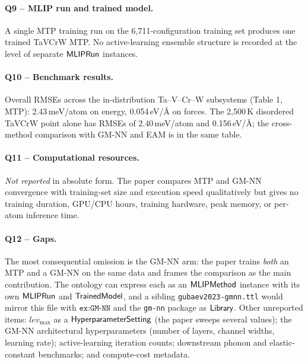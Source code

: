 \paragraph{Q9 -- MLIP run and trained model.}
A single MTP training run on the 6{,}711-configuration training set
produces one trained TaVCrW MTP. No active-learning ensemble
structure is recorded at the level of separate
$\mathsf{MLIPRun}$ instances.


\paragraph{Q10 -- Benchmark results.}
Overall RMSEs across the in-distribution Ta--V--Cr--W subsystems
(Table 1, MTP): 2.43\,meV/atom on energy, 0.054\,eV/\AA{} on
forces. The 2{,}500\,K disordered TaVCrW point alone has RMSEs of
2.40\,meV/atom and 0.156\,eV/\AA{}; the cross-method comparison with
GM-NN and EAM is in the same table.


\paragraph{Q11 -- Computational resources.}
\emph{Not reported} in absolute form. The paper compares MTP and
GM-NN convergence with training-set size and execution speed
qualitatively but gives no training duration, GPU/CPU hours,
training hardware, peak memory, or per-atom inference time.


\paragraph{Q12 -- Gaps.}
The most consequential omission is the GM-NN arm: the paper trains
\emph{both} an MTP and a GM-NN on the same data and frames the
comparison as the main contribution. The ontology can express each
as an $\mathsf{MLIPMethod}$ instance with its own
$\mathsf{MLIPRun}$ and $\mathsf{TrainedModel}$, and a sibling
\texttt{gubaev2023-gmnn.ttl} would mirror this file with
$\texttt{ex:GM-NN}$ and the \texttt{gm-nn} package as
$\mathsf{Library}$. Other unreported items: $\mathit{lev}_{\max}$
as a $\mathsf{HyperparameterSetting}$ (the paper sweeps several values);
the GM-NN architectural hyperparameters (number of layers, channel
widths, learning rate); active-learning iteration counts; downstream
phonon and elastic-constant benchmarks; and compute-cost metadata.
